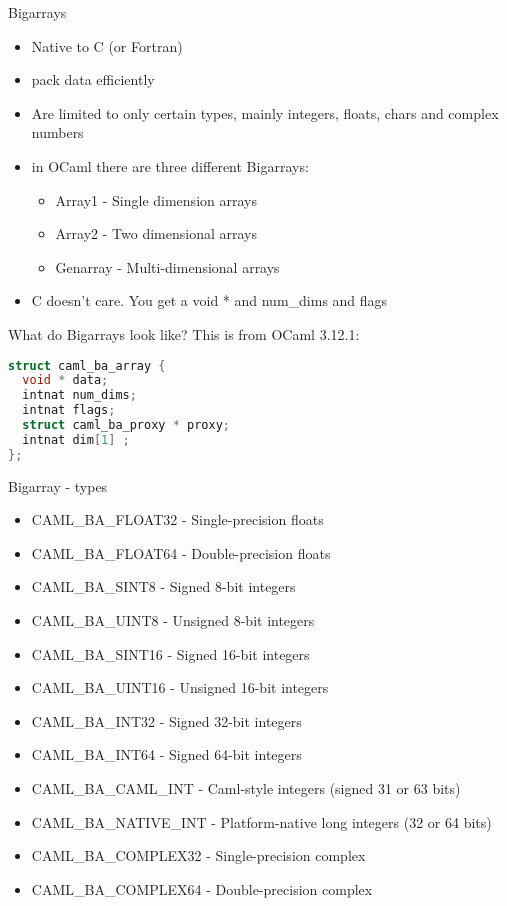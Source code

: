\documentclass{beamer}
\begin{document}
\begin{frame}{Bigarrays}
\begin{itemize}
    \item Native to C (or Fortran)
    \item pack data efficiently
    \item Are limited to only certain types, mainly integers, floats, chars and complex numbers
    \item in OCaml there are three different Bigarrays:
    \begin{itemize}
        \item Array1 - Single dimension arrays
        \item Array2 - Two dimensional arrays
        \item Genarray - Multi-dimensional arrays
    \end{itemize}
    \item C doesn't care.  You get a void * and num\_dims and flags
\end{itemize}
\end{frame}

\begin{frame}[fragile]{What do Bigarrays look like?}
This is from OCaml 3.12.1:
\begin{lstlisting}[language=C]
struct caml_ba_array {
  void * data;                
  intnat num_dims;            
  intnat flags;  
  struct caml_ba_proxy * proxy; 
  intnat dim[1] ;
};
\end{lstlisting}
\end{frame}

\begin{frame}{Bigarray - types}
\begin{itemize}
    \item CAML\_BA\_FLOAT32 -  Single-precision floats
    \item CAML\_BA\_FLOAT64 -  Double-precision floats
    \item CAML\_BA\_SINT8 -  Signed 8-bit integers
    \item CAML\_BA\_UINT8 -  Unsigned 8-bit integers
    \item CAML\_BA\_SINT16 -  Signed 16-bit integers
    \item CAML\_BA\_UINT16 -  Unsigned 16-bit integers
    \item CAML\_BA\_INT32 -  Signed 32-bit integers
    \item CAML\_BA\_INT64 -  Signed 64-bit integers
    \item CAML\_BA\_CAML\_INT -  Caml-style integers (signed 31 or 63 bits)
    \item CAML\_BA\_NATIVE\_INT -  Platform-native long integers (32 or 64 bits)
    \item CAML\_BA\_COMPLEX32 -  Single-precision complex
    \item CAML\_BA\_COMPLEX64 -  Double-precision complex
\end{itemize}
\end{frame}
\end{document}
